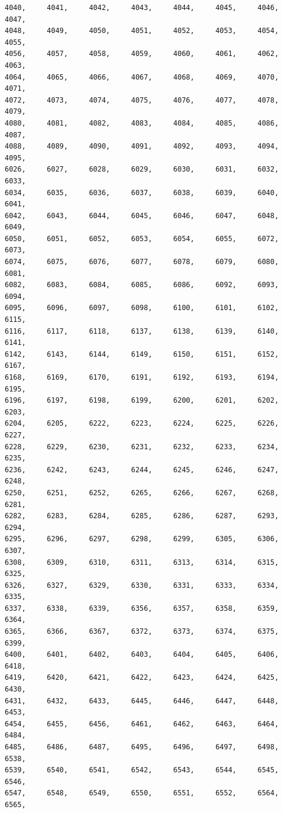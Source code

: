 \documentclass[a4paper,11pt]{report}
\begin{document}
\begin{verbatim}
4040,     4041,     4042,     4043,     4044,     4045,     4046,     4047,
4048,     4049,     4050,     4051,     4052,     4053,     4054,     4055,
4056,     4057,     4058,     4059,     4060,     4061,     4062,     4063,
4064,     4065,     4066,     4067,     4068,     4069,     4070,     4071,
4072,     4073,     4074,     4075,     4076,     4077,     4078,     4079,
4080,     4081,     4082,     4083,     4084,     4085,     4086,     4087,
4088,     4089,     4090,     4091,     4092,     4093,     4094,     4095,
6026,     6027,     6028,     6029,     6030,     6031,     6032,     6033,
6034,     6035,     6036,     6037,     6038,     6039,     6040,     6041,
6042,     6043,     6044,     6045,     6046,     6047,     6048,     6049,
6050,     6051,     6052,     6053,     6054,     6055,     6072,     6073,
6074,     6075,     6076,     6077,     6078,     6079,     6080,     6081,
6082,     6083,     6084,     6085,     6086,     6092,     6093,     6094,
6095,     6096,     6097,     6098,     6100,     6101,     6102,     6115,
6116,     6117,     6118,     6137,     6138,     6139,     6140,     6141,
6142,     6143,     6144,     6149,     6150,     6151,     6152,     6167,
6168,     6169,     6170,     6191,     6192,     6193,     6194,     6195,
6196,     6197,     6198,     6199,     6200,     6201,     6202,     6203,
6204,     6205,     6222,     6223,     6224,     6225,     6226,     6227,
6228,     6229,     6230,     6231,     6232,     6233,     6234,     6235,
6236,     6242,     6243,     6244,     6245,     6246,     6247,     6248,
6250,     6251,     6252,     6265,     6266,     6267,     6268,     6281,
6282,     6283,     6284,     6285,     6286,     6287,     6293,     6294,
6295,     6296,     6297,     6298,     6299,     6305,     6306,     6307,
6308,     6309,     6310,     6311,     6313,     6314,     6315,     6325,
6326,     6327,     6329,     6330,     6331,     6333,     6334,     6335,
6337,     6338,     6339,     6356,     6357,     6358,     6359,     6364,
6365,     6366,     6367,     6372,     6373,     6374,     6375,     6399,
6400,     6401,     6402,     6403,     6404,     6405,     6406,     6418,
6419,     6420,     6421,     6422,     6423,     6424,     6425,     6430,
6431,     6432,     6433,     6445,     6446,     6447,     6448,     6453,
6454,     6455,     6456,     6461,     6462,     6463,     6464,     6484,
6485,     6486,     6487,     6495,     6496,     6497,     6498,     6538,
6539,     6540,     6541,     6542,     6543,     6544,     6545,     6546,
6547,     6548,     6549,     6550,     6551,     6552,     6564,     6565,

\end{verbatim}
\end{document}

